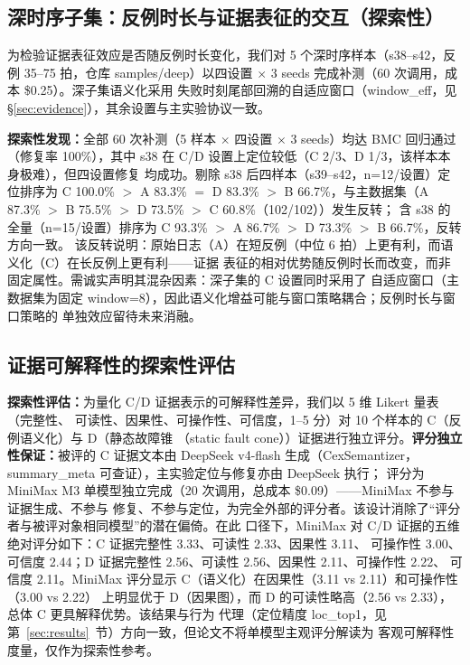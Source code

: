 \documentclass[twocolumn,10pt]{ctexart}
\begin{document}
\subsection{深时序子集：反例时长与证据表征的交互（探索性）}\label{sec:deep}

为检验证据表征效应是否随反例时长变化，我们对 5 个深时序样本（s38--s42，反例 35--75 拍，仓库
samples/deep）以四设置 $\times$ 3 seeds 完成补测（60 次调用，成本 \$0.25）。深子集语义化采用
失败时刻尾部回溯的自适应窗口（window\_eff，见 \S\ref{sec:evidence}），其余设置与主实验协议一致。

\textbf{探索性发现：}全部 60 次补测（5 样本 $\times$ 四设置 $\times$ 3 seeds）均达 BMC 回归通过
（修复率 100\%），其中 s38 在 C/D 设置上定位较低（C 2/3、D 1/3，该样本本身极难），但四设置修复
均成功。剔除 s38 后四样本（s39--s42，n=12/设置）定位排序为 C 100.0\% $>$ A 83.3\% $=$ D 83.3\%
$>$ B 66.7\%，与主数据集（A 87.3\% $>$ B 75.5\% $>$ D 73.5\% $>$ C 60.8\%（102/102））发生反转；
含 s38 的全量（n=15/设置）排序为 C 93.3\% $>$ A 86.7\% $>$ D 73.3\% $>$ B 66.7\%，反转方向一致。
该反转说明：原始日志（A）在短反例（中位 6 拍）上更有利，而语义化（C）在长反例上更有利——证据
表征的相对优势随反例时长而改变，而非固定属性。需诚实声明其混杂因素：深子集的 C 设置同时采用了
自适应窗口（主数据集为固定 window=8），因此语义化增益可能与窗口策略耦合；反例时长与窗口策略的
单独效应留待未来消融。

\subsection{证据可解释性的探索性评估}\label{sec:interp}

\textbf{探索性评估：}为量化 C/D 证据表示的可解释性差异，我们以 5 维 Likert 量表（完整性、
可读性、因果性、可操作性、可信度，1--5 分）对 10 个样本的 C（反例语义化）与 D（静态故障锥
（static fault cone））证据进行独立评分。\textbf{评分独立性保证：}被评的 C 证据文本由 DeepSeek
v4-flash 生成（CexSemantizer，summary\_meta 可查证），主实验定位与修复亦由 DeepSeek 执行；
评分为 MiniMax M3 单模型独立完成（20 次调用，总成本 \$0.09）——MiniMax 不参与证据生成、不参与
修复、不参与定位，为完全外部的评分者。该设计消除了“评分者与被评对象相同模型”的潜在偏倚。在此
口径下，MiniMax 对 C/D 证据的五维绝对评分如下：C 证据完整性 3.33、可读性 2.33、因果性 3.11、
可操作性 3.00、可信度 2.44；D 证据完整性 2.56、可读性 2.56、因果性 2.11、可操作性 2.22、
可信度 2.11。MiniMax 评分显示 C（语义化）在因果性（3.11 vs 2.11）和可操作性（3.00 vs 2.22）
上明显优于 D（因果图），而 D 的可读性略高（2.56 vs 2.33），总体 C 更具解释优势。该结果与行为
代理（定位精度 loc\_top1，见第~\ref{sec:results}~节）方向一致，但论文不将单模型主观评分解读为
客观可解释性度量，仅作为探索性参考。
\end{document}
